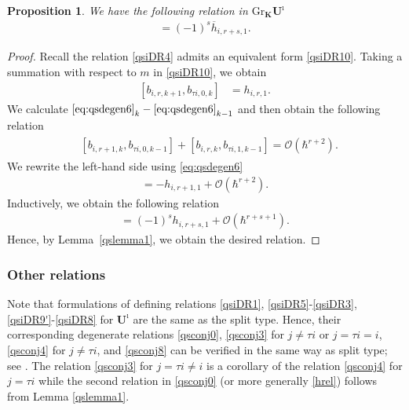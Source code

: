 \documentclass[11pt,reqno]{amsart}
\numberwithin{equation}{section}
\newtheorem{prop}[thm]{Proposition}
\theoremstyle{definition}
\theoremstyle{remark}
\newcommand{\mc}{\mathcal}
\def \h{\hbar}
\def \H{h}
\def \X{b}
\def \Gr{\mathrm{Gr}}
\def \tUi{\mathbf{U}^\imath}
\def \ov{\overline}
\begin{document}
\begin{prop}
We have the following relation in $\Gr_{\mathbf{K}}\tUi$
\begin{align*}
[\ov{\X}_{i,r,1},\ov{\X}_{\tau i,s,1}]=(-1)^s\ov{\H}_{i,r+s, 1} .
\end{align*}
\end{prop}
\begin{proof}
Recall the relation \eqref{qsiDR4} admits an equivalent form \eqref{qsiDR10}. Taking a summation with respect to $m$ in \eqref{qsiDR10}, we obtain
\begin{align}\label{eq:qsdegen6}
[\X_{i,r,k+1},\X_{\tau i,0,k}]&  = \H_{i,r, 1}.
\end{align}
We calculate $\eqref{eq:qsdegen6}_{k}-\eqref{eq:qsdegen6}_{k-1}$ and then obtain the following relation
\begin{align*}%
\begin{split}
&[\X_{i,r+1,k},\X_{\tau i,0,k-1}] +[\X_{i,r,k},\X_{\tau i,1,k-1}]=\mc O(\h^{r+2}).
\end{split}
\end{align*}
We rewrite the left-hand side using \eqref{eq:qsdegen6}
\begin{align*}
[\X_{i,r,k},\X_{\tau i,1,k-1}]=-\H_{i,r+1, 1}+\mc O(\h^{r+2}).
\end{align*}
Inductively, we obtain the following relation
\begin{align*}%
[\X_{i,r,k+1-s},\X_{\tau i,s,k-s}]=(-1)^s\H_{i,r+s, 1}+\mc O(\h^{r+s+1}).
\end{align*}
Hence, by Lemma~\ref{qslemma1}, we obtain the desired relation.  
\end{proof}

\subsubsection{Other relations}
Note that formulations of defining relations \eqref{qsiDR1}, \eqref{qsiDR5}-\eqref{qsiDR3}, \eqref{qsiDR9'}-\eqref{qsiDR8} for $\tUi$ are the same as the split type. Hence, their corresponding degenerate relations \eqref{qsconj0}, \eqref{qsconj3} for $j\neq \tau i$ or $j=\tau i=i$, \eqref{qsconj4} for $j\neq \tau i$, and \eqref{qsconj8} can be verified in the same way as split type; see \cite[\S 5]{KLWZ23b}. The relation \eqref{qsconj3} for $j=\tau i\ne i$ is a corollary of the relation \eqref{qsconj4} for $j=\tau i$ while the second relation in \eqref{qsconj0} (or more generally \eqref{hrel}) follows from Lemma \ref{qslemma1}.
\end{document}
